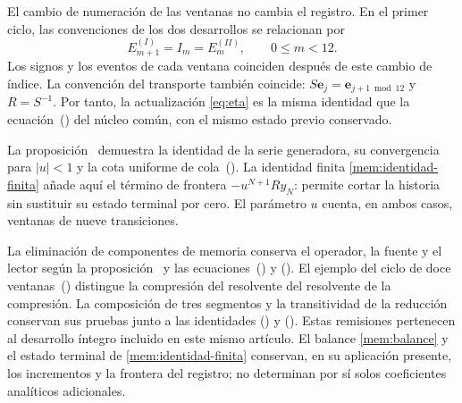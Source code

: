 El cambio de numeración de las ventanas no cambia el registro. En el
primer ciclo, las convenciones de los dos desarrollos se relacionan por
\[
 E^{(I)}_{m+1}=I_m=E^{(II)}_m,\qquad 0\leq m<12.
\]
Los signos y los eventos de cada ventana coinciden después de este
cambio de índice. La convención del transporte también coincide:
\(S\mathbf e_j=\mathbf e_{j+1\bmod12}\) y \(R=S^{-1}\).
Por tanto, la actualización \eqref{eq:eta} es la misma identidad que
la ecuación~\textup{()} del núcleo
común, con el mismo estado previo conservado.

La proposición~ demuestra la identidad
de la serie generadora, su convergencia para \(|u|<1\) y la cota uniforme
de cola~\textup{()}. La identidad finita
\eqref{mem:identidad-finita} añade aquí el término de frontera
\(-u^{N+1}Ry_N\): permite cortar la historia sin sustituir su estado
terminal por cero. El parámetro \(u\) cuenta, en ambos casos, ventanas
de nueve transiciones.

La eliminación de componentes de memoria conserva el operador, la fuente
y el lector según la proposición~ y
las ecuaciones~\textup{()} y
\textup{()}. El ejemplo del ciclo
de doce ventanas~\textup{()}
distingue la compresión del resolvente del resolvente de la compresión.
La composición de tres segmentos y la transitividad de la reducción
conservan sus pruebas junto a las identidades
\textup{()} y
\textup{()}.
Estas remisiones pertenecen al desarrollo íntegro incluido en este mismo
artículo. El balance \eqref{mem:balance} y el estado terminal de
\eqref{mem:identidad-finita} conservan, en su aplicación presente,
los incrementos y la frontera del registro; no determinan por sí solos
coeficientes analíticos adicionales.

